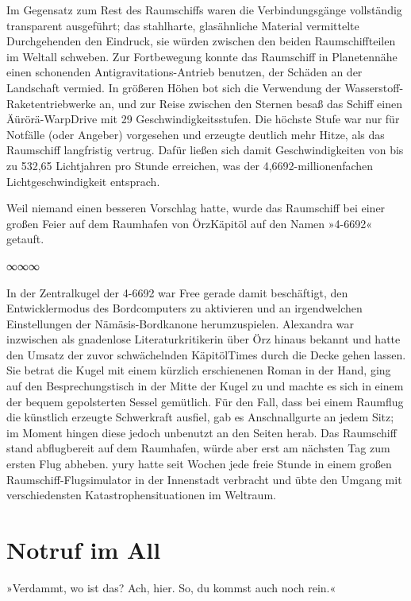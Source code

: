 Im Gegensatz zum Rest des Raumschiffs waren die Verbindungsgänge vollständig transparent ausgeführt; das stahlharte, glasähnliche Material vermittelte Durchgehenden den Eindruck, sie würden zwischen den beiden Raumschiffteilen im Weltall schweben. Zur Fortbewegung konnte das Raumschiff in Planetennähe einen schonenden Antigravitations-Antrieb benutzen, der Schäden an der Landschaft vermied. In größeren Höhen bot sich die Verwendung der Wasserstoff-Raketentriebwerke an, und zur Reise zwischen den Sternen besaß das Schiff einen Äürörä-WarpDrive mit 29 Geschwindigkeitsstufen. Die höchste Stufe war nur für Notfälle (oder Angeber) vorgesehen und erzeugte deutlich mehr Hitze, als das Raumschiff langfristig vertrug. Dafür ließen sich damit Geschwindigkeiten von bis zu 532,65 Lichtjahren pro Stunde erreichen, was der 4,6692-millionenfachen Lichtgeschwindigkeit entsprach.

Weil niemand einen besseren Vorschlag hatte, wurde das Raumschiff bei einer großen Feier auf dem Raumhafen von ÖrzKäpitöl auf den Namen »4-6692« getauft.

\begin{center}
    ∞∞∞
\end{center}

In der Zentralkugel der 4-6692 war Free gerade damit beschäftigt, den Entwicklermodus des Bordcomputers zu aktivieren und an irgendwelchen Einstellungen der Nämäsis-Bordkanone herumzuspielen. Alexandra war inzwischen als gnadenlose Literaturkritikerin über Örz hinaus bekannt und hatte den Umsatz der zuvor schwächelnden KäpitölTimes durch die Decke gehen lassen. Sie betrat die Kugel mit einem kürzlich erschienenen Roman in der Hand, ging auf den Besprechungstisch in der Mitte der Kugel zu und machte es sich in einem der bequem gepolsterten Sessel gemütlich. Für den Fall, dass bei einem Raumflug die künstlich erzeugte Schwerkraft ausfiel, gab es Anschnallgurte an jedem Sitz; im Moment hingen diese jedoch unbenutzt an den Seiten herab. Das Raumschiff stand abflugbereit auf dem Raumhafen, würde aber erst am nächsten Tag zum ersten Flug abheben. yury hatte seit Wochen jede freie Stunde in einem großen Raumschiff-Flugsimulator in der Innenstadt verbracht und übte den Umgang mit verschiedensten Katastrophensituationen im Weltraum.


\chapter{Notruf im All}

»Verdammt, wo ist das? Ach, hier. So, du kommst auch noch rein.«

